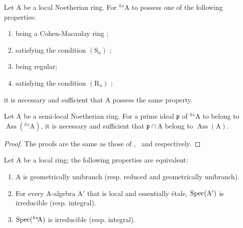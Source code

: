 \begin{corollary}[18.8.13]
\label{IV.18.8.13}
Let $\mathrm{A}$ be a local Noetherian ring.
For ${}^{hs}\!\mathrm{A}$ to possess one of the following properties:
\begin{enumerate}[label=\emph{\alph*)}]
  \item being a Cohen-Macaulay ring ;
  \item satisfying the condition $(\mathrm{S}_n)$ ;
  \item being regular;
  \item satisfying the condition $(\mathrm{R}_n)$ ;
\end{enumerate}
it is necessary and sufficient that A possess the same property.
\end{corollary}

\begin{corollary}[18.8.14]
\label{IV.18.8.14}
Let $\mathrm{A}$ be a semi-local Noetherian ring.
For a prime ideal $\mathfrak{p}$ of ${}^{hs}\!\mathrm{A}$ to belong to $\operatorname{Ass}({}^{hs}\!\mathrm{A})$, it is necessary and sufficient that $\mathfrak{p}\cap\mathrm{A}$ belong to $\operatorname{Ass}(\mathrm{A})$.
\end{corollary}

\begin{proof}
The proofs are the same as those of ,~ and  respectively.
\end{proof}

\begin{proposition}[18.8.15]
\label{IV.18.8.15}
Let $\mathrm{A}$ be a local ring;
the following properties are equivalent:
\begin{enumerate}[label=\emph{\alph*)}]
  \item A is geometrically unibranch (resp. reduced and geometrically unibranch).
  \item For every A-algebra $\mathrm{A}'$ that is local and essentially \'{e}tale, $\operatorname{Spec}(\mathrm{A}')$ is irreducible (resp. integral).
  \item $\operatorname{Spec}({}^{hs}\!\mathrm{A})$ is irreducible (resp. integral).
\end{enumerate}
\end{proposition}

